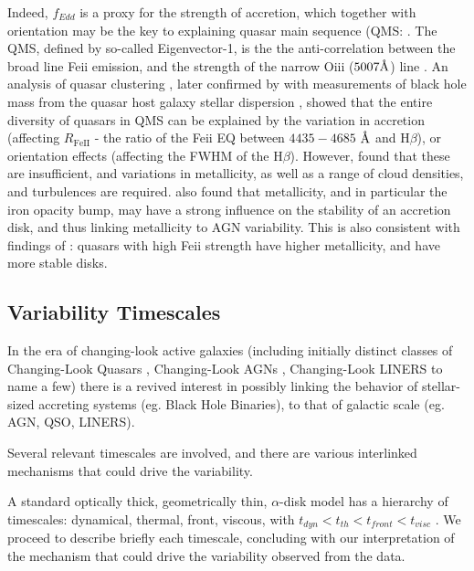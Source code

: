 \documentclass[twocolumn]{aastex62}
\let\oldAA\AA
\renewcommand{\AA}{\text{\normalfont\oldAA}}
\begin{document}
Indeed, $f_{Edd}$ is a proxy for the strength of accretion, which together with orientation may be the key to explaining quasar main sequence (QMS: \citep{shen2014, marziani2018}. The QMS, defined by so-called Eigenvector-1, is the the anti-correlation between the broad line Fe{\sc ii} emission, and the strength of the narrow O{\sc iii} ($5007 \mbox{\AA}$) line \citep{wang1996}. An analysis of quasar clustering \citep{shen2014}, later confirmed by \citet{sun2015} with measurements of  black hole mass from the quasar host galaxy stellar dispersion \citep{ferrarese2000, kormendy2013}, showed that the entire diversity of quasars in  QMS can be explained by the variation in accretion (affecting $R_{\mathrm{Fe  II}}$ - the ratio of the  Fe{\sc ii} EQ  between $4435-4685$ $\mbox{\AA}$ and H$\beta$), or orientation effects (affecting the FWHM of the H$\beta$). However, \citet{panda2019a, panda2019b} found that these are insufficient, and variations in metallicity, as well as a range of cloud densities, and turbulences are required.  \cite{jiang2016} also found that metallicity, and in particular the iron opacity bump, may have a strong influence on the stability of an accretion disk, and thus linking metallicity to AGN variability. This is also consistent with findings of \cite{sun2018}: quasars with high  Fe{\sc ii} strength have higher metallicity, and have more stable disks. 



\subsection{Variability Timescales}

In the era of changing-look active galaxies (including initially distinct classes of Changing-Look Quasars \citep{lamassa2015, macleod2019}, Changing-Look AGNs \citep{marchese2012, bianchi2009,risaliti2009}, Changing-Look LINERS \citep{frederick2019} to name a few) there is a revived interest in possibly linking the behavior of stellar-sized accreting systems (eg. Black Hole Binaries),  to that of galactic scale (eg. AGN, QSO, LINERS)\citep{noda2018, ruan2019}. 

Several relevant timescales are involved, and there are various interlinked mechanisms that could drive the variability. 

A standard optically thick, geometrically thin, $\alpha$-disk model has a hierarchy of timescales: dynamical, thermal, front, viscous, with   $t_{dyn} < t_{th} < t_{front}  < t_{visc} $ \citep{netzer2013, frank2002}. We proceed to describe briefly each timescale, concluding with our interpretation of the mechanism that could drive the variability observed from the data. 
\end{document}
